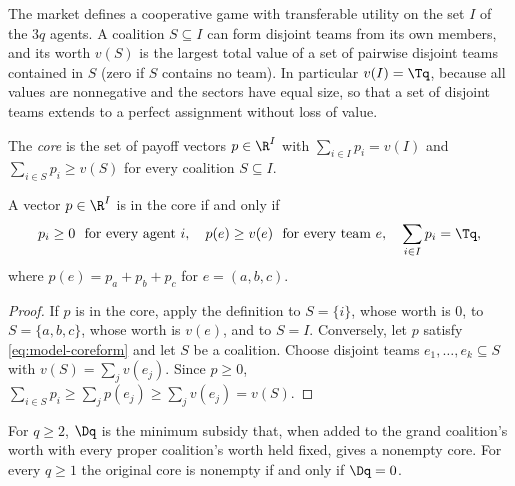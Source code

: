The market defines a cooperative game with transferable utility on the set $I$ of the $3q$
agents. A coalition $S\subseteq I$ can form disjoint teams from its own members, and its worth
$v(S)$ is the largest total value of a set of pairwise disjoint teams contained in $S$ (zero if
$S$ contains no team). In particular $v(I)=\Tq$, because all values are nonnegative and the
sectors have equal size, so that a set of disjoint teams extends to a perfect assignment
without loss of value.

\begin{definition}\label{def:model-core}
The \emph{core} is the set of payoff vectors $p\in\R^I$ with $\sum_{i\in I}p_i=v(I)$ and
$\sum_{i\in S}p_i\ge v(S)$ for every coalition $S\subseteq I$.
\end{definition}

\begin{lemma}\label{lem:model-coreform}
A vector $p\in\R^I$ is in the core if and only if
\begin{equation}\label{eq:model-coreform}
p_i\ge0\ \text{ for every agent } i,\quad p(e)\ge v(e)\ \text{ for every team } e,\quad
\sum_{i\in I}p_i=\Tq ,
\end{equation}
where $p(e)=p_a+p_b+p_c$ for $e=(a,b,c)$.
\end{lemma}

\begin{proof}
If $p$ is in the core, apply the definition to $S=\{i\}$, whose worth is $0$, to
$S=\{a,b,c\}$, whose worth is $v(e)$, and to $S=I$. Conversely, let $p$ satisfy
\eqref{eq:model-coreform} and let $S$ be a coalition. Choose disjoint teams
$e_1,\dots,e_k\subseteq S$ with $v(S)=\sum_j v(e_j)$. Since $p\ge0$,
$\sum_{i\in S}p_i\ge\sum_j p(e_j)\ge\sum_j v(e_j)=v(S)$.
\end{proof}

\begin{proposition}\label{prop:model-core}
For $q\ge2$, $\Dq$ is the minimum subsidy that, when added to the grand coalition's
worth with every proper coalition's worth held fixed, gives a nonempty core. For every
$q\ge1$ the original core is nonempty if and only if $\Dq=0$.
\end{proposition}

